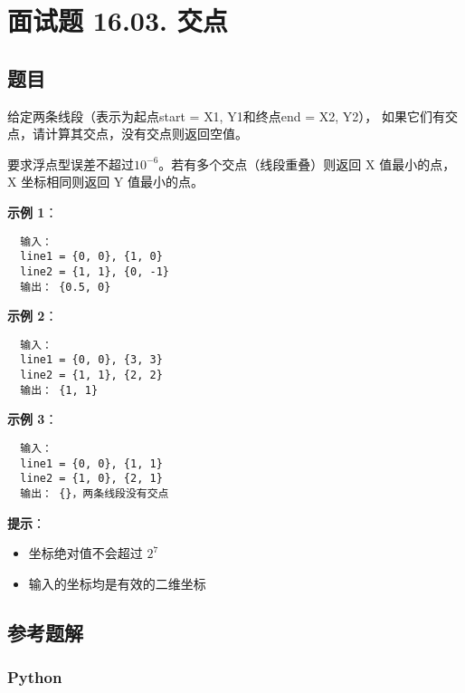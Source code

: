 \newpage
\section{面试题 16.03. 交点}
\label{leetcode:it_16.03}

\subsection{题目}

给定两条线段（表示为起点start = {X1, Y1}和终点end = {X2, Y2}），
如果它们有交点，请计算其交点，没有交点则返回空值。

要求浮点型误差不超过$10^{-6}$。若有多个交点（线段重叠）则返回 X 值最小的点，
X 坐标相同则返回 Y 值最小的点。

\textbf{示例 1}：

\begin{verbatim}
  输入：
  line1 = {0, 0}, {1, 0}
  line2 = {1, 1}, {0, -1}
  输出： {0.5, 0}
\end{verbatim}

\textbf{示例 2}：

\begin{verbatim}
  输入：
  line1 = {0, 0}, {3, 3}
  line2 = {1, 1}, {2, 2}
  输出： {1, 1}
\end{verbatim}

\textbf{示例 3}：

\begin{verbatim}
  输入：
  line1 = {0, 0}, {1, 1}
  line2 = {1, 0}, {2, 1}
  输出： {}，两条线段没有交点
\end{verbatim}

\textbf{提示}：

\begin{itemize}
  \item 坐标绝对值不会超过 $2^{7}$
  \item 输入的坐标均是有效的二维坐标
\end{itemize}

\subsection{参考题解}

\subsubsection{Python}

